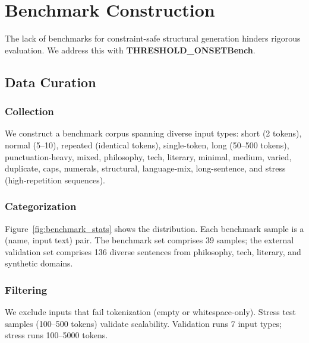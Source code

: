 \documentclass[10pt]{article}
\begin{document}
\section{Benchmark Construction}
\label{sec:benchmark}

The lack of benchmarks for constraint-safe structural generation hinders rigorous evaluation. We address this with \textbf{THRESHOLD\_ONSETBench}.

\subsection{Data Curation}

\subsubsection{Collection}
We construct a benchmark corpus spanning diverse input types: short (2 tokens), normal (5--10), repeated (identical tokens), single-token, long (50--500 tokens), punctuation-heavy, mixed, philosophy, tech, literary, minimal, medium, varied, duplicate, caps, numerals, structural, language-mix, long-sentence, and stress (high-repetition sequences).

\subsubsection{Categorization}
Figure~\ref{fig:benchmark_stats} shows the distribution. Each benchmark sample is a (name, input text) pair. The benchmark set comprises 39 samples; the external validation set comprises 136 diverse sentences from philosophy, tech, literary, and synthetic domains.

\subsubsection{Filtering}
We exclude inputs that fail tokenization (empty or whitespace-only). Stress test samples (100--500 tokens) validate scalability. Validation runs 7 input types; stress runs 100--5000 tokens.
\end{document}
